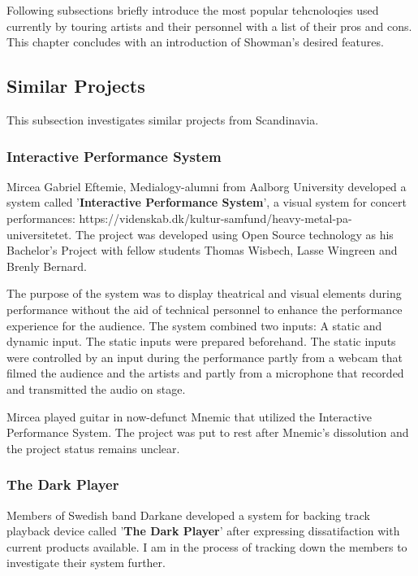 Following subsections briefly introduce the most popular tehcnoloqies used currently by touring artists and their personnel with a list of their pros and cons. This chapter concludes with an introduction of Showman's desired features. \\

\subsection{Similar Projects}
This subsection investigates similar projects from Scandinavia. \\

\subsubsection{Interactive Performance System}
Mircea Gabriel Eftemie, Medialogy-alumni from Aalborg University developed a system called '\textbf{Interactive Performance System}', a visual system for concert performances: https://videnskab.dk/kultur-samfund/heavy-metal-pa-universitetet. The project was developed using Open Source technology as his Bachelor's Project with fellow students Thomas Wisbech, Lasse Wingreen and Brenly Bernard. \newline

The purpose of the system was to display theatrical and visual elements during performance without the aid of technical personnel to enhance the performance experience for the audience. The system combined two inputs: A static and dynamic input. The static inputs were prepared beforehand. The static inputs were controlled by an input during the performance partly from a webcam that filmed the audience and the artists and partly from a microphone that recorded and transmitted the audio on stage. \newline

Mircea played guitar in now-defunct Mnemic that utilized the Interactive Performance System. The project was put to rest after Mnemic's dissolution and the project status remains unclear. \\

\subsubsection{The Dark Player}
Members of Swedish band Darkane developed a system for backing track playback device called '\textbf{The Dark Player}' after expressing dissatifaction with current products available. I am in the process of tracking down the members to investigate their system further. \\

